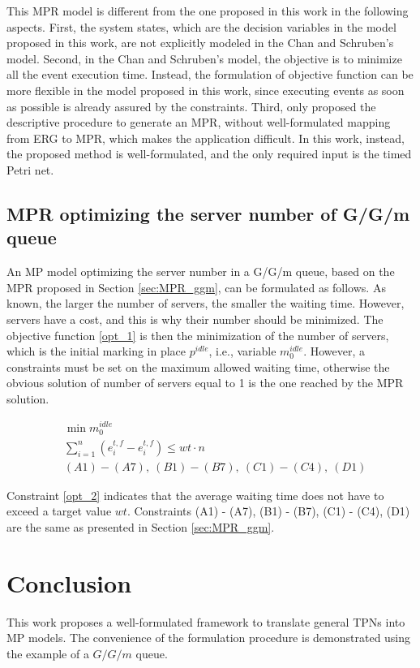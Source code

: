 \documentclass[suppldata]{interact}
\theoremstyle{plain}
\theoremstyle{definition}
\theoremstyle{remark}
\begin{document}
This MPR model is different from the one proposed in this work in the following aspects. First, the system states, which are the decision variables in the model proposed in this work, are not explicitly modeled in the Chan and Schruben's model. Second, in the Chan and Schruben's model, the objective is to minimize all the event execution time. Instead, the formulation of objective function can be more flexible in the model proposed in this work, since executing events as soon as possible is already assured by the constraints. Third, \cite{chan2008optimization} only proposed the descriptive procedure to generate an MPR, without well-formulated mapping from ERG to MPR, which makes the application difficult. In this work, instead, the proposed method is well-formulated, and the only required input is the timed Petri net.


\subsection{MPR optimizing the server number of G/G/m queue}
An MP model optimizing the server number in a G/G/m queue, based on the MPR proposed in Section \ref{sec:MPR_ggm}, can be formulated as follows. 
As known, the larger the number of servers, the smaller the waiting time. However, servers have a cost, and this is why their number should be minimized.  
The objective function \eqref{opt_1} is then the minimization of the number of servers, which is the initial marking in place $p^{idle}$, i.e., variable $m^{idle}_0$. However, a constraints must be set on the maximum allowed waiting time, otherwise the obvious solution of number of servers equal to 1 is the one reached by the MPR solution.

\begin{eqnarray}
	&\min{m^{idle}_0} \label{opt_1} \\
	&\sum_{i=1}^{n} (e^{t,f}_i-e^{t,f}_i) \le wt\cdot n \label{opt_2}\\
	&(A1) - (A7),\ (B1) - (B7),\ (C1) - (C4),\ (D1) \nonumber
\end{eqnarray}

Constraint \eqref{opt_2} indicates that the average waiting time does not have to exceed a target value $wt$. Constraints (A1) - (A7), (B1) - (B7), (C1) - (C4), (D1) are the same as presented in Section \ref{sec:MPR_ggm}.

\section{Conclusion} \label{sec:conclude}
This work proposes a well-formulated framework to translate general TPNs into MP models. The convenience of the formulation procedure is demonstrated using the example of a $G/G/m$ queue.
\end{document}
